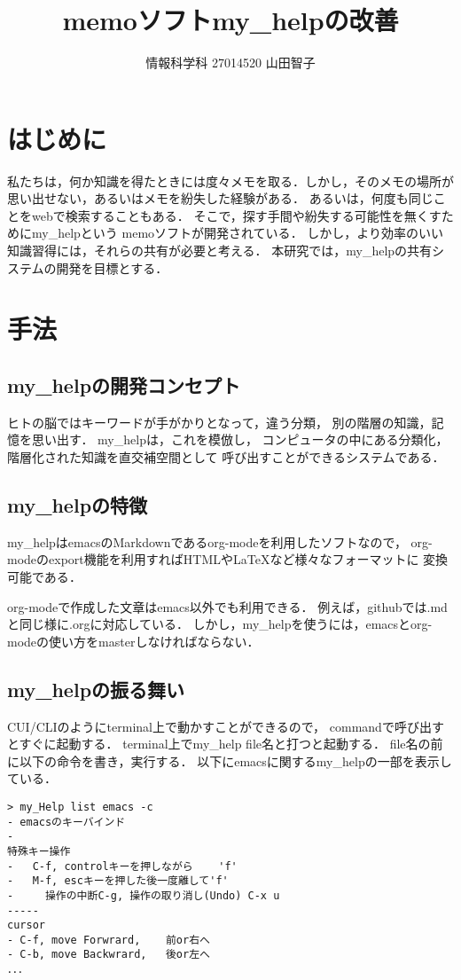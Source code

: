 \documentclass[a4j,twocolumn,uplatex]{jsarticle}
\begin{document}
\title{memoソフトmy\_helpの改善}
\author{情報科学科 \hspace{5mm} 27014520 \hspace{5mm}山田智子}
\date{}
\maketitle

\section{はじめに}
私たちは，何か知識を得たときには度々メモを取る．しかし，そのメモの場所が思い出せない，あるいはメモを紛失した経験がある．
あるいは，何度も同じことをwebで検索することもある．
そこで，探す手間や紛失する可能性を無くすためにmy\_helpという
memoソフトが開発されている\cite{my_help}．
しかし，より効率のいい知識習得には，それらの共有が必要と考える．
本研究では，my\_helpの共有システムの開発を目標とする．

\section{手法}
\subsection{my\_helpの開発コンセプト}
\label{sec-2-1}
ヒトの脳ではキーワードが手がかりとなって，違う分類，
別の階層の知識，記憶を思い出す．
my\_helpは，これを模倣し，
コンピュータの中にある分類化，階層化された知識を直交補空間として
呼び出すことができるシステムである．

\subsection{my\_helpの特徴}
\label{sec-2-2}
my\_helpはemacsのMarkdownであるorg-modeを利用したソフトなので，
org-modeのexport機能を利用すればHTMLやLaTeXなど様々なフォーマットに
変換可能である\cite{org-mode}．

org-modeで作成した文章はemacs以外でも利用できる．
例えば，githubでは.mdと同じ様に.orgに対応している．
しかし，my\_helpを使うには，emacsとorg-modeの使い方をmasterしなければならない．

\subsection{my\_helpの振る舞い}
\label{sec-2-3}
CUI/CLIのようにterminal上で動かすことができるので，
commandで呼び出すとすぐに起動する．
terminal上でmy\_help file名と打つと起動する．
file名の前に以下の命令を書き，実行する．
以下にemacsに関するmy\_helpの一部を表示している．
{\small\setlength\baselineskip{10pt}	%
\begin{verbatim}
> my_Help list emacs -c
- emacsのキーバインド
- 
特殊キー操作
-   C-f, controlキーを押しながら    'f'
-   M-f, escキーを押した後一度離して'f'
-     操作の中断C-g, 操作の取り消し(Undo) C-x u
-----
cursor
- C-f, move Forwrard,    前or右へ
- C-b, move Backwrard,   後or左へ
．．．
\end{verbatim}
}
\end{document}

